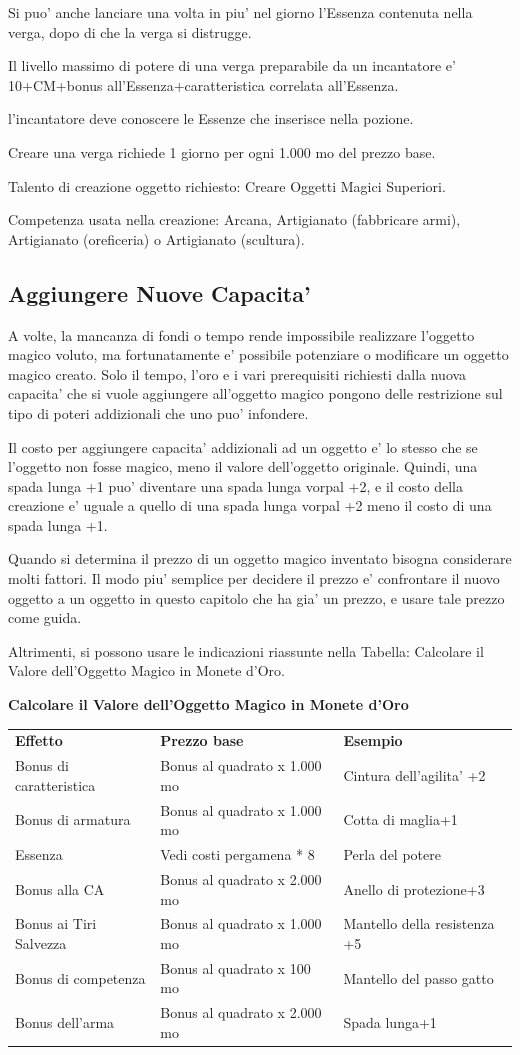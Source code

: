 \documentclass[a4paper,11pt,twoside,openany]{book}
\begin{document}
{Si puo' anche lanciare una volta in piu' nel giorno l'Essenza contenuta nella verga, dopo di che la verga si distrugge.

Il livello massimo di potere di una verga preparabile da un incantatore e' 10+CM+bonus all'Essenza+caratteristica correlata all'Essenza.

l'incantatore deve conoscere le Essenze che inserisce nella pozione.

Creare una verga richiede 1 giorno per ogni 1.000 mo del prezzo base.

Talento di creazione oggetto richiesto: Creare Oggetti Magici Superiori.

Competenza usata nella creazione: Arcana, Artigianato (fabbricare armi), Artigianato (oreficeria) o Artigianato (scultura).

\subsection{Aggiungere Nuove Capacita'}

A volte, la mancanza di fondi o tempo rende impossibile realizzare l'oggetto magico voluto, ma fortunatamente e' possibile potenziare o modificare un oggetto magico creato. Solo il tempo, l'oro e i vari prerequisiti richiesti dalla nuova capacita' che si vuole aggiungere all'oggetto magico pongono delle restrizione sul tipo di poteri addizionali che uno puo' infondere.

Il costo per aggiungere capacita' addizionali ad un oggetto e' lo stesso che se l'oggetto non fosse magico, meno il valore dell'oggetto originale. Quindi, una spada lunga +1 puo' diventare una spada lunga vorpal +2, e il costo della creazione e' uguale a quello di una spada lunga vorpal +2 meno il costo di una spada lunga +1.

Quando si determina il prezzo di un oggetto magico inventato bisogna considerare molti fattori. Il modo piu' semplice per decidere il prezzo e' confrontare il nuovo oggetto a un oggetto in questo capitolo che ha gia' un prezzo, e usare tale prezzo come guida.

Altrimenti, si possono usare le indicazioni riassunte nella Tabella: Calcolare il Valore dell'Oggetto Magico in Monete d'Oro.

\bigskip

\textbf{Calcolare il Valore dell'Oggetto Magico in Monete d'Oro}

\begin{tabular}{lll}
\toprule
\textbf{Effetto} & \textbf{Prezzo base} & \textbf{Esempio}\tabularnewline
Bonus di caratteristica & Bonus al quadrato x 1.000 mo & Cintura dell'agilita' +2\tabularnewline
Bonus di armatura & Bonus al quadrato x 1.000 mo & Cotta di maglia+1\tabularnewline
Essenza & Vedi costi pergamena {*} 8 & Perla del potere\tabularnewline
Bonus alla CA & Bonus al quadrato x 2.000 mo & Anello di protezione+3\tabularnewline
Bonus ai Tiri Salvezza & Bonus al quadrato x 1.000 mo & Mantello della resistenza +5\tabularnewline
Bonus di competenza & Bonus al quadrato x 100 mo & Mantello del passo gatto\tabularnewline
Bonus dell'arma & Bonus al quadrato x 2.000 mo & Spada lunga+1\tabularnewline
\end{tabular}

}
\end{document}
